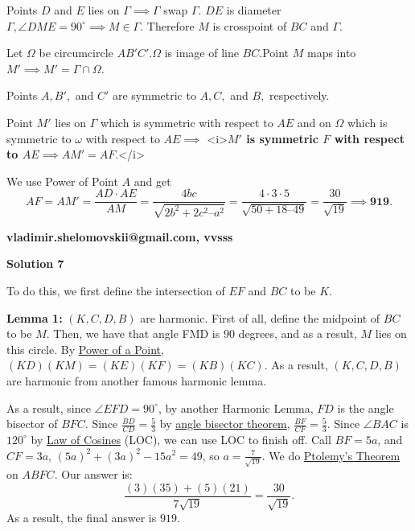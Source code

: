 \begin{enumerate}
 Points $D$ and $E$ lies on $\Gamma \implies \Gamma$ swap $\Gamma.$
$DE$ is diameter $\Gamma, \angle DME = 90^\circ \implies  M \in \Gamma.$ Therefore $M$ is crosspoint of $BC$ and $\Gamma.$

 Let $\Omega$ be circumcircle $AB'C'.  \Omega$ is image of line $BC.$Point $M$ maps into $M' \implies M' = \Gamma \cap \Omega.$

 Points $A, B',$ and $C'$ are symmetric to $A, C,$ and $B,$ respectively. 

 Point $M'$ lies on $\Gamma$ which is symmetric with respect to $AE$ and on $\Omega$ which is symmetric to $\omega$ with respect to $AE  \implies$
<i>\textbf{$M'$ is symmetric $F$ with respect to $AE \implies AM' = AF.$}</i>

 We use Power of Point $A$ and get 
 \[AF = AM' = \frac {AD \cdot AE}{AM} = \frac {4b c}{\sqrt{2 b^2 + 2 c^2 – a^2}} = \frac {4 \cdot 3 \cdot 5}{\sqrt{ 50 + 18 – 49}} = \frac {30}{\sqrt{19}} \implies \boxed{\textbf{919}}.\]

 \textbf{vladimir.shelomovskii@gmail.com, vvsss}

 



\textbf{Solution 7}

To do this, we first define the intersection of $EF$ and $BC$ to be $K$. 

 \textbf{Lemma 1:} $(K, C, D, B)$ are harmonic. First of all, define the midpoint of $BC$ to be $M$. Then, we have that angle FMD is $90$ degrees, and as a result, $M$ lies on this circle. By \href{https://artofproblemsolving.com/wiki/index.php?title=Power\_of\_a\_Point}{Power of a Point}, $(KD)(KM) = (KE)(KF) = (KB)(KC)$. As a result, $(K, C, D, B)$ are harmonic from another famous harmonic lemma.

 As a result, since $\angle EFD = 90^{\circ}$, by another Harmonic Lemma, $FD$ is the angle bisector of $BFC$. Since $\frac{BD}{CD} = \frac{5}{3}$ by \href{https://artofproblemsolving.com/wiki/index.php?title=Angle\_bisector\_theorem}{angle bisector theorem}, $\frac{BF}{CF} = \frac{5}{3}$. Since $\angle BAC$ is $120^{\circ}$ by \href{https://artofproblemsolving.com/wiki/index.php?title=Law\_of\_Cosines}{Law of Cosines} (LOC), we can use LOC to finish off. Call $BF = 5a$, and $CF = 3a$, $(5a)^2+(3a)^2-15a^2 = 49$, so $a = \frac{7}{\sqrt{19}}$. We do \href{https://artofproblemsolving.com/wiki/index.php?title=Ptolemy\%27s\_Theorem}{Ptolemy's Theorem} on $ABFC$. Our answer is: 
 \[\frac{(3)(35)+(5)(21)}{7\sqrt{19}} = \frac{30}{\sqrt{19}}.\]As a result, the final answer is $\boxed{919}$.


\end{enumerate}
